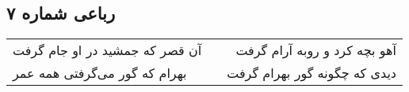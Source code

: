 \begin{center}
\section*{رباعی شماره ۷}
\label{sec:sh007}
\begin{longtable}{l p{0.5cm} r}
آن قصر که جمشید در او جام گرفت
&&
آهو بچه کرد و روبه آرام گرفت
\\
بهرام که گور می‌گرفتی همه عمر
&&
دیدی که چگونه گور بهرام گرفت
\\
\end{longtable}
\end{center}
